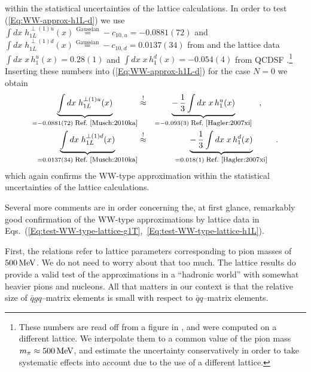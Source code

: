 \documentclass[a4paper,11pt]{article}
\newcommand{\ba}{\begin{eqnarray}}
\newcommand{\ea}{\end{eqnarray}}
\begin{document}
within the statistical uncertainties of the lattice calculations.
%
In order to test (\ref{Eq:WW-approx-h1L-d}) we use
$\int dx\;h_{1L}^{\perp(1)u}(x)\stackrel{\text{Gaussian}}{=}-c_{10,u}=-0.0881(72)$ 
and
$\int dx\;h_{1L}^{\perp(1)d}(x)\stackrel{\text{Gaussian}}{=}-c_{10,d}=0.0137(34)$
from \cite{Musch:2010ka} and the lattice data 
$\int d x \;x\,h_1^u(x)= 0.28(1)$ and
$\int d x \;x\,h_1^d(x)= -0.054(4)$
from QCDSF \cite{Gockeler:2005cj}.\footnote{
  These numbers are read off from a figure in \cite{Gockeler:2005cj},
  and were computed on a different lattice. We interpolate them to a
  common value of the pion mass $m_\pi\approx500\,{\rm MeV}$, and
  estimate the uncertainty conservatively in order to take systematic effects
  into account due to the use of a different lattice.}
Inserting these numbers into  (\ref{Eq:WW-approx-h1L-d}) for the case
$N=0$ we obtain
\ba
        \underbrace{\int d x\;h_{1L}^{\perp(1)u}(x)}
        _{= -0.0881(72)\;\mbox{\footnotesize Ref.~\cite{Musch:2010ka}}}
        &\stackrel{!}{\approx}&
        \underbrace{-\,\frac{1}{3}\int d x\;x\,h_1^u(x)}
        _{= -0.093(3) \;\mbox{\footnotesize Ref.~\cite{Hagler:2007xi}}}
        \hspace{3mm} , \hspace{7mm} \nonumber \\
        \underbrace{\int d x\;h_{1L}^{\perp(1)d}(x)}
        _{= 0.0137(34) \;\mbox{\footnotesize Ref.~\cite{Musch:2010ka}}}
        &\stackrel{!}{\approx}&
        \underbrace{-\,\frac{1}{3}\int d x\;x\,h_1^d(x)}
        _{= 0.018(1) \;\mbox{\footnotesize Ref.~\cite{Hagler:2007xi}}}
        \hspace{3mm}. 
        \label{Eq:test-WW-type-lattice-h1L}
\ea
which again confirms the WW-type approximation within the statistical
uncertainties of the lattice calculations.

Several more comments are in order concerning the, at first glance, remarkably
good confirmation of the  WW-type approximations by lattice data in
Eqs.~(\ref{Eq:test-WW-type-lattice-g1T},~\ref{Eq:test-WW-type-lattice-h1L}).

First, the relations refer to lattice parameters corresponding
to pion masses of $500\,{\rm MeV}$. We do not
need to worry about that too much. The lattice results do provide
a valid test of the approximations in a ``hadronic world'' with
somewhat heavier pions and nucleons. All that matters in our
context is that the relative size of $\bar{q}gq$--matrix elements
is small with respect to $\bar{q}q$--matrix elements.
\end{document}
